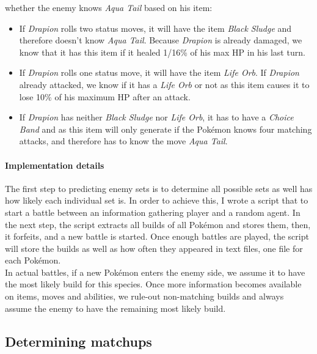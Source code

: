 whether the enemy knows \textit{Aqua Tail} based on his item:
\begin{itemize}
	\item If \textit{Drapion} rolls two status moves, it will have the item \textit{Black Sludge} and therefore 
	doesn't know \textit{Aqua Tail}. Because \textit{Drapion} is already damaged, we know that it has this item
	if it healed 1/16\% of his max \ac{HP} in his last turn. 
	\item If \textit{Drapion} rolls one status move, it will have the item \textit{Life Orb}. If \textit{Drapion}
	already attacked, we know if it has a \textit{Life Orb} or not as this item causes it to lose 10\% of his
	maximum \ac{HP} after an attack.
	\item If \textit{Drapion} has neither \textit{Black Sludge} nor \textit{Life Orb}, it has to have a
	\textit{Choice Band} and as this item will only generate if the Pokémon knows four matching attacks,
	and therefore has to know the move \textit{Aqua Tail}.
\end{itemize}
\paragraph{Implementation details}
The first step to predicting enemy sets is to determine all possible sets as well has how likely each individual set
is. In order to achieve this, I wrote a script that to start a battle between an information gathering player and 
a random agent. In the next step, the script extracts all builds of all Pokémon and stores them, then, it forfeits, 
and a new battle is started. Once enough battles are played, the script will store the builds as well as how often
they appeared in text files, one file for each Pokémon. \\
In actual battles, if a new Pokémon enters the enemy side, we assume it to have the most likely build for this species. 
Once more information becomes available on items, moves and abilities, we rule-out non-matching builds and always
assume the enemy to have the remaining most likely build.

\subsection{Determining matchups}
\label{sec:implementation-matchups}